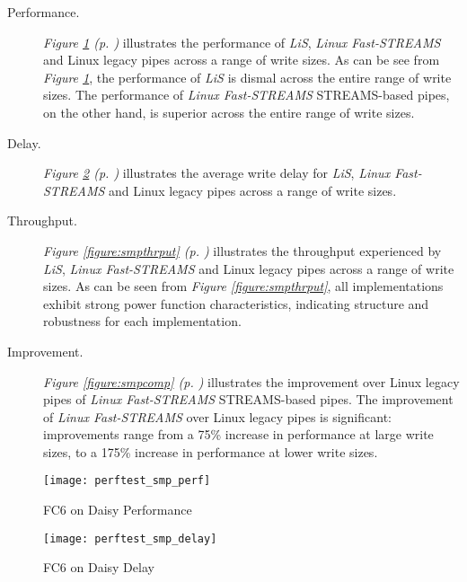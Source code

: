 \documentclass[letterpaper,final,notitlepage,twocolumn,10pt,twoside]{article}
\begin{document}
\begin{description}

\item[Performance.]

\textit{Figure \ref{figure:smpperf} (p. \pageref{figure:smpperf})} illustrates
the performance of \textsl{LiS}, \textsl{Linux Fast-STREAMS} and Linux legacy
pipes across a range of write sizes.  As can be see from \textit{Figure
\ref{figure:smpperf}}, the performance of \textsl{LiS} is dismal across the
entire range of write sizes.  The performance of \textsl{Linux Fast-STREAMS}
STREAMS-based pipes, on the other hand, is superior across the entire range of
write sizes.

\item[Delay.]

\textit{Figure \ref{figure:smpdelay} (p. \pageref{figure:smpdelay})}
illustrates the average write delay for \textsl{LiS}, \textsl{Linux
Fast-STREAMS} and Linux legacy pipes across a range of write sizes.

\item[Throughput.]

\textit{Figure \ref{figure:smpthrput} (p. \pageref{figure:smpthrput})}
illustrates the throughput experienced by \textsl{LiS}, \textsl{Linux
Fast-STREAMS} and Linux legacy pipes across a range of write sizes.  As can be
seen from \textit{Figure \ref{figure:smpthrput}}, all implementations exhibit
strong power function characteristics, indicating structure and robustness for
each implementation.

\item[Improvement.]

\textit{Figure \ref{figure:smpcomp} (p. \pageref{figure:smpcomp})} illustrates
the improvement over Linux legacy pipes of \textsl{Linux Fast-STREAMS}
STREAMS-based pipes.  The improvement of \textsl{Linux Fast-STREAMS} over
Linux legacy pipes is significant: improvements range from a 75\% increase in
performance at large write sizes, to a 175\% increase in performance at lower
write sizes.

\end{description}

\begin{figure}[p]
\texttt{[image: perftest\_smp\_perf]}
\caption[FC6 on Daisy Performance]{FC6 on Daisy Performance}
\label{figure:smpperf}
\end{figure}

\begin{figure}[p]
\texttt{[image: perftest\_smp\_delay]}
\caption[FC6 on Daisy Delay]{FC6 on Daisy Delay}
\label{figure:smpdelay}
\end{figure}
\end{document}
